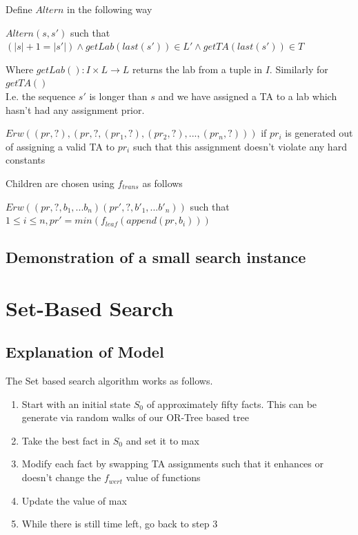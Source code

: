 \documentclass{article}
\begin{document}
Define $Altern$ in the following way 

\begin{center}
  $Altern(s, s')$ such that $(|s| + 1 = |s'|) \land getLab(last(s')) \in
  L' \land getTA(last(s')) \in T$ 
\end{center}

Where $getLab() : I \times L \rightarrow L$ returns the lab from a
tuple in $I$. Similarly for $getTA()$\\

I.e. the sequence $s'$ is longer than $s$ and we have assigned a TA to a lab
which hasn't had any assignment prior.

\begin{center}
  $Erw((pr, ?), (pr, ?, (pr_1, ?), (pr_2, ?), ... , (pr_n, ?)))$ if $pr_i$
  is generated out of assigning a valid TA to $pr_i$ such that this
  assignment doesn't violate any hard constants
\end{center}


Children are chosen using $f_{trans}$ as follows

\begin{center}
  $Erw((pr, ?, b_1, ... b_n)(pr', ?, b'_1, ... b'_n))$ such that $1
  \leq i \leq n, pr' = min(f_{leaf}(append(pr, b_i)))$
  
\end{center}

\subsection{Demonstration of a small search instance}



\section{Set-Based Search}

\subsection{Explanation of Model}

The Set based search algorithm works as follows.

\begin{enumerate}

\item Start with an initial state $S_0$ of approximately fifty facts.
  This can be generate via random walks of our OR-Tree based tree

\item Take the best fact in $S_0$ and set it to max

\item Modify each fact by swapping TA assignments such that it
  enhances or doesn't change the $f_{wert}$ value of functions

\item Update the value of max

\item While there is still time left, go back to step 3


\end{enumerate}
\end{document}
